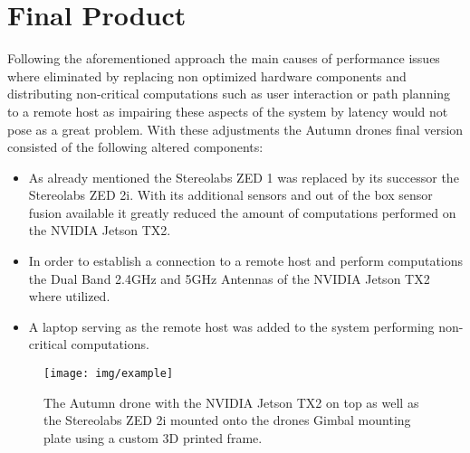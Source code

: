 \section{Final Product}
Following the aforementioned approach the main causes of performance issues where eliminated by replacing non optimized hardware components and distributing non-critical computations such as user interaction or path planning to a remote host as impairing these aspects of the system by latency would not pose as a great problem. 
With these adjustments the Autumn drones final version consisted of the following altered components:
\begin{itemize}
	\item As already mentioned the Stereolabs ZED 1 was replaced by its successor the Stereolabs ZED 2i. With its additional sensors and out of the box sensor fusion available it greatly reduced the amount of computations performed on the NVIDIA Jetson TX2. 
	\item In order to establish a connection to a remote host and perform computations the Dual Band 2.4GHz and 5GHz Antennas of the NVIDIA Jetson TX2 where utilized. 
	\item A laptop serving as the remote host was added to the system performing non-critical computations.
\end{itemize}

\begin{figure}
	\centering
	\texttt{[image: img/example]}
	\caption{
		The Autumn drone with the NVIDIA Jetson TX2 on top as well as the Stereolabs ZED 2i mounted onto the drones Gimbal mounting plate using a custom 3D printed frame. 
	}
	\label{fig:autumn}
\end{figure}
\filbreak